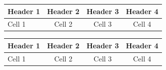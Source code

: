 \documentclass{article}
\begin{document}
\setlength\dashlinedash{1.2pt}
\setlength\dashlinegap{1.5pt}

\begin{table}[h]
\centering
{}
\begin{tabular}{|l:c:c:c|}
\hline
Header 1 & Header 2 & Header 3 & Header 4 \\
\hline
Cell 1 & Cell 2 & Cell 3 & Cell 4 \\
\hline
\end{tabular}
\end{table}

\begin{table}[h]
\centering
\begin{tabular}{|l!{\color{black!25}:}c!{\color{black!25}:}c!{\color{black!25}:}c|}
\hline
Header 1 & Header 2 & Header 3 & Header 4 \\
\hline
Cell 1 & Cell 2 & Cell 3 & Cell 4 \\
\hline
\end{tabular}
\end{table}
\end{document}
